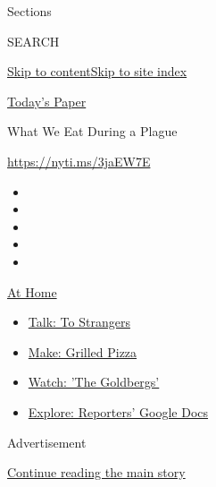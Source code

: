 Sections

SEARCH

\protect\hyperlink{site-content}{Skip to
content}\protect\hyperlink{site-index}{Skip to site index}

\href{https://myaccount.nytimes3xbfgragh.onion/auth/login?response_type=cookie\&client_id=vi}{}

\href{https://www.nytimes3xbfgragh.onion/section/todayspaper}{Today's
Paper}

What We Eat During a Plague

\url{https://nyti.ms/3jaEW7E}

\begin{itemize}
\item
\item
\item
\item
\item
\end{itemize}

\href{https://www.nytimes3xbfgragh.onion/spotlight/at-home?action=click\&pgtype=Article\&state=default\&region=TOP_BANNER\&context=at_home_menu}{At
Home}

\begin{itemize}
\tightlist
\item
  \href{https://www.nytimes3xbfgragh.onion/2020/08/03/well/family/the-benefits-of-talking-to-strangers.html?action=click\&pgtype=Article\&state=default\&region=TOP_BANNER\&context=at_home_menu}{Talk:
  To Strangers}
\item
  \href{https://www.nytimes3xbfgragh.onion/2020/08/01/at-home/coronavirus-make-pizza-on-a-grill.html?action=click\&pgtype=Article\&state=default\&region=TOP_BANNER\&context=at_home_menu}{Make:
  Grilled Pizza}
\item
  \href{https://www.nytimes3xbfgragh.onion/2020/07/31/arts/television/goldbergs-abc-stream.html?action=click\&pgtype=Article\&state=default\&region=TOP_BANNER\&context=at_home_menu}{Watch:
  'The Goldbergs'}
\item
  \href{https://www.nytimes3xbfgragh.onion/interactive/2020/at-home/even-more-reporters-editors-diaries-lists-recommendations.html?action=click\&pgtype=Article\&state=default\&region=TOP_BANNER\&context=at_home_menu}{Explore:
  Reporters' Google Docs}
\end{itemize}

Advertisement

\protect\hyperlink{after-top}{Continue reading the main story}

